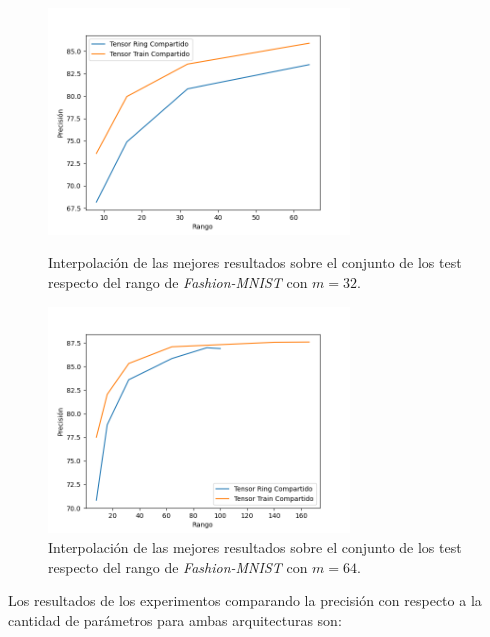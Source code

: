 \documentclass[spanish]{article}
\theoremstyle{definition}
\theoremstyle{remark}
\numberwithin{equation}{section}
\numberwithin{equation}{section} %
\begin{document}
\begin{figure}[H]
   \begin{minipage}{0.48\textwidth}
     \centering
     \captionsetup{justification=centering}
     \includegraphics[trim={0.8cm 0 1cm 1cm},clip,width=8cm]{img/FASHION_MNIST/Fashion_interpolate_best_run_m=32_vs_ranks.png}
     \caption{Interpolación de las mejores resultados  sobre el conjunto de los test respecto del rango de \textit{Fashion-MNIST} con $m=32$.}\label{Fig:Fashion_interpolate_best_run_m=32_vs_ranks}
   \end{minipage}\hfill
   \begin{minipage}{0.48\textwidth}
     \centering
     \captionsetup{justification=centering}
     \includegraphics[trim={0.8cm 0 1cm 1cm},clip,width=8cm]{img/FASHION_MNIST/Fashion_interpolate_best_run_m=64_vs_ranks.png}
     \caption{Interpolación de las mejores resultados  sobre el conjunto de los test respecto del rango de \textit{Fashion-MNIST} con $m=64$.}\label{Fig:Fashion_interpolate_best_run_m=64_vs_ranks}
   \end{minipage}
\end{figure}
Los resultados de los experimentos comparando la precisión con respecto a la cantidad de parámetros para ambas arquitecturas son:
\end{document}
